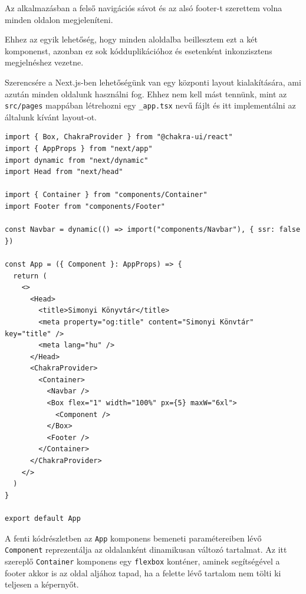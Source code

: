 Az alkalmazásban a felső navigációs sávot és az alsó footer-t szerettem volna minden oldalon megjeleníteni.

Ehhez az egyik lehetőség, hogy minden aloldalba beillesztem ezt a két komponenst, azonban ez sok kódduplikációhoz és esetenként
inkonzisztens megjelnéshez vezetne.

Szerencsére a Next.js-ben lehetőségünk van egy központi layout kialakítására, ami azután minden oldalunk használni fog. Ehhez nem kell
mást tennünk, mint az \lstinline|src/pages| mappában létrehozni egy \lstinline|_app.tsx| nevű fájlt és itt implementálni az általunk
kívánt layout-ot.

\begin{lstlisting}[caption=Minden oldalra kiterjedő layout alkalmazása Next.js keretrendszerben]
import { Box, ChakraProvider } from "@chakra-ui/react"
import { AppProps } from "next/app"
import dynamic from "next/dynamic"
import Head from "next/head"

import { Container } from "components/Container"
import Footer from "components/Footer"

const Navbar = dynamic(() => import("components/Navbar"), { ssr: false })

const App = ({ Component }: AppProps) => {
  return (
    <>
      <Head>
        <title>Simonyi Könyvtár</title>
        <meta property="og:title" content="Simonyi Könvtár" key="title" />
        <meta lang="hu" />
      </Head>
      <ChakraProvider>
        <Container>
          <Navbar />
          <Box flex="1" width="100%" px={5} maxW="6xl">
            <Component />
          </Box>
          <Footer />
        </Container>
      </ChakraProvider>
    </>
  )
}

export default App
\end{lstlisting}

A fenti kódrészletben az \lstinline|App| komponens bemeneti paramétereiben lévő \lstinline|Component| reprezentálja az oldalanként
dinamikusan változó tartalmat. Az itt szereplő \lstinline|Container| komponens egy \lstinline|flexbox| konténer, aminek segítségével
a footer akkor is az oldal aljához tapad, ha a felette lévő tartalom nem tölti ki teljesen a képernyőt.
